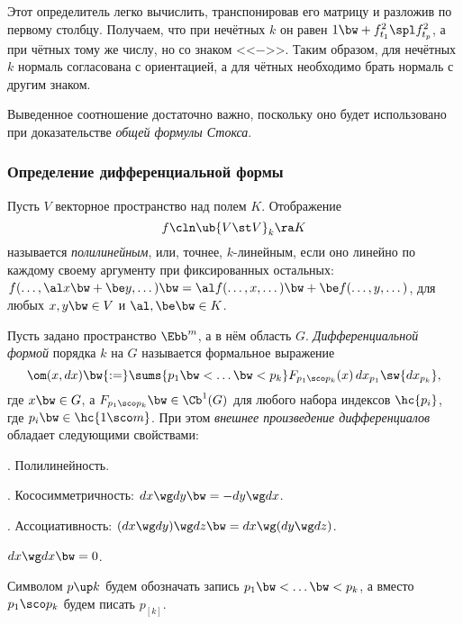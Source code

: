 \documentclass[a4paper]{article}
\newcommand{\pv}[1]{{p_{[#1]}}}
\newcommand{\di}[3]{{d {#1}_{#2_{#3}}}}
\begin{document}
Этот определитель легко вычислить,
транспонировав его матрицу и разложив по первому столбцу.
Получаем, что при нечётных $k$ он равен $1 \bw+ f_{t_1}^2\spl f_{t_p}^2$, а при чётных
тому же числу, но со знаком <<$-$>>. Таким образом, для нечётных $k$ нормаль согласована с
ориентацией, а для чётных необходимо брать нормаль с другим знаком.

\begin{note}
\label{orientation.note}
Выведенное соотношение достаточно важно, поскольку оно будет использовано при доказательстве
\emph{общей формулы Стокса}.
\end{note}

\subsubsection{Определение дифференциальной формы}

\begin{df}
Пусть $V$ векторное пространство над полем $K$. Отображение
$$f\cln \ub{V \st V}_k \ra K$$
называется \emph{полилинейным}, или, точнее, $k$-линейным, если оно линейно по каждому
своему аргументу при фиксированных остальных:
$f(\dots,\al x \bw+ \be y,\dots) \bw= \al f(\dots,x,\dots) \bw+ \be f(\dots,y,\dots)$, для любых
$x,y \bw\in V$ и $\al,\be \bw\in K$.
\end{df}

\begin{df}
Пусть задано пространство $\Ebb^m$, а в нём область $G$. \emph{Дифференциальной формой} порядка
$k$ на $G$ называется формальное выражение
$$
  \om(x,d x) \bw{:=} \sums{p_1 \bw< \dots \bw< p_k} F_{p_1\sco p_k}(x)\,\di xp1 \sw \di xpk,
$$
где $x \bw\in G$, а $F_{p_1\sco p_k} \bw\in \Cb^1(G)$ для любого набора индексов $\hc{p_i}$,
где $p_i \bw\in \hc{1\sco m}$.
При этом \emph{внешнее произведение дифференциалов} обладает следующими свойствами:

. Полилинейность.

. Кососимметричность: $d x \wg d y \bw= -d y \wg d x$.

. Ассоциативность: $(d x \wg d y)\wg d z \bw= d x \wg (d y \wg d z)$.
\end{df}

\begin{imp}
$d x \wg d x \bw= 0$.
\end{imp}

\begin{note}
Символом $p\up k$ будем обозначать запись $p_1 \bw< \dots \bw< p_k$,
а вместо $p_1\sco p_k$ будем писать $\pv k$.
\end{note}
\end{document}
